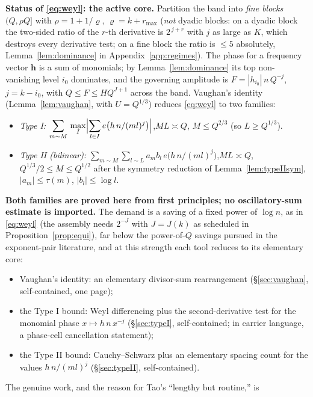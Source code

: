 \documentclass[11pt]{article}
\theoremstyle{definition}
\theoremstyle{plain}
\begin{document}
\noindent\textbf{Status of \eqref{eq:weyl}: the active core.}  Partition
the band into \emph{fine blocks} $(Q,\rho Q]$ with
$\rho=1+1/\varrho$, $\varrho=k+r_{\max}$ (\emph{not} dyadic blocks: on a
dyadic block the two-sided ratio of the $r$-th derivative is $2^{\,j+r}$
with $j$ as large as $K$, which destroys every derivative test; on a
fine block the ratio is $\le5$ absolutely, Lemma~\ref{lem:dominance} in
Appendix~\ref{app:regimes}).
The phase for a frequency vector $\mathbf h$ is a sum of monomials; by
Lemma~\ref{lem:dominance} its top non-vanishing level
$i_0$ dominates, and the governing amplitude is
$F=|h_{i_0}|\,n\,Q^{-j}$, $j=k-i_0$, with $Q\le F\le HQ^{J+1}$ across the
band.  Vaughan's identity (Lemma~\ref{lem:vaughan}, with $U=Q^{1/3}$)
reduces \eqref{eq:weyl} to two families:
\begin{itemize}
\item[(I)] \emph{Type I:}\quad
$\displaystyle\sum_{m\sim M}\,\max_{I}\Bigl|\sum_{l\in I}
e\bigl(h\,n/(ml)^{j}\bigr)\Bigr|$,\qquad $ML\asymp Q$,
$M\le Q^{2/3}$ (so $L\ge Q^{1/3}$).
\item[(II)] \emph{Type II (bilinear):}\quad
$\displaystyle\sum_{m\sim M}\sum_{l\sim L}a_m b_l\,
e\bigl(h\,n/(ml)^{j}\bigr)$,\qquad $ML\asymp Q$,
$Q^{1/3}/2\le M\le Q^{1/2}$ after the symmetry reduction of
Lemma~\ref{lem:typeIIsym}, $|a_m|\le\tau(m)$, $|b_l|\le\log l$.
\end{itemize}
\textbf{Both families are proved here from first principles; no
oscillatory-sum estimate is imported.}  The demand is a saving of a fixed
power of $\log n$, as in \eqref{eq:weyl} (the assembly needs $2^{-J}$ with $J=J(k)$ as
scheduled in Proposition~\ref{prop:equi}), far
below the power-of-$Q$ savings pursued in the exponent-pair literature,
and at this strength each tool reduces to its elementary core:
\begin{itemize}
\item Vaughan's identity: an elementary divisor-sum rearrangement
(\S\ref{sec:vaughan}, self-contained, one page);
\item the Type I bound: Weyl differencing plus the second-derivative
test for the monomial phase $x\mapsto h\,n\,x^{-j}$
(\S\ref{sec:typeI}, self-contained; in carrier language, a phase-cell
cancellation statement);
\item the Type II bound: Cauchy--Schwarz plus an elementary spacing
count for the values $h\,n/(ml)^j$ (\S\ref{sec:typeII},
self-contained).
\end{itemize}
The genuine work, and the reason for Tao's ``lengthy but routine,'' is
\end{document}
